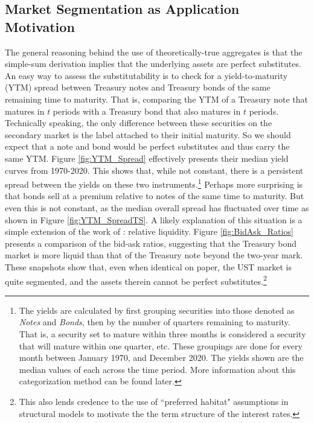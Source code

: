 \documentclass[11pt,a4paper,margin=1.5in]{article}
\begin{document}
\subsection{Market Segmentation as Application Motivation}
\label{subsec:MktSeg}
The general reasoning behind the use of theoretically-true aggregates is that the simple-sum derivation implies that the underlying assets are perfect substitutes. 
An easy way to assess the substitutability is to check for a yield-to-maturity (YTM) spread between Treasury notes and Treasury bonds of the same remaining time to maturity.
That is, comparing the YTM of a Treasury note that matures in $t$ periods with a Treasury bond that also matures in $t$ periods.
Technically speaking, the only difference between these securities on the secondary market is the label attached to their initial maturity.
So we should expect that a note and bond would be perfect substitutes and thus carry the same YTM.
Figure \ref{fig:YTM_Spread} effectively presents their median yield curves from 1970-2020.
This shows that, while not constant, there is a persistent spread between the yields on these two instruments.\footnote{
	The yields are calculated by first grouping securities into those denoted as {\em Notes} and {\em Bonds}, then by the number of quarters remaining to maturity.
	That is, a security set to mature within three months is considered a security that will mature within one quarter, etc.
	These groupings are done for every month between January 1970, and December 2020. 
	The yields shown are the median values of each across the time period.
	More information about this categorization method can be found later.}
Perhaps more surprising is that bonds sell at a premium relative to notes of the same time to maturity. 
But even this is not constant, as the median overall spread has fluctuated over time as shown in Figure \ref{fig:YTM_SpreadTS}.
A likely explanation of this situation is a simple extension of the work of \citet{Amihud-Mendelson:1991}: relative liquidity.
Figure \ref{fig:BidAsk_Ratios} presents a comparison of the bid-ask ratios, suggesting that the Treasury bond market is more liquid than that of the Treasury note beyond the two-year mark.
These snapshots show that, even when identical on paper, the UST market is quite segmented, and the assets therein cannot be perfect substitutes.\footnote{
	This also lends credence to the use of ``preferred habitat" assumptions in structural models to motivate the the term structure of the interest rates.}
\end{document}
